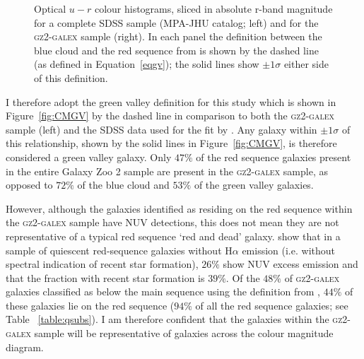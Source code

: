 \begin{figure}
\caption[Optical $u-r$ colour histograms in absolute r-band magnitude slices of the \textsc{gz2-galex} and Baldry et al. (2004) complete SDSS samples]{Optical $u-r$ colour histograms, sliced in absolute r-band magnitude for a complete SDSS sample (MPA-JHU catalog; left) and for the \textsc{gz2-galex} sample (right). In each panel the definition between the blue cloud and the red sequence from \citet{Baldry04} is shown by the dashed line (as defined in Equation~\ref{eqgv}); the solid lines show $\pm 1\sigma$ either side of this definition.}
\label{fig:cmgvsplit}
\end{figure}

I therefore adopt the \citet{Baldry04} green valley definition for this study which is shown in Figure~\ref{fig:CMGV} by the dashed line in comparison to both the \textsc{gz2-galex} sample (left) and the SDSS data used for the fit by \cite[][right]{Baldry04}. Any galaxy within $\pm 1\sigma$ of this relationship, shown by the solid lines in Figure~\ref{fig:CMGV}, is therefore considered a green valley galaxy. Only $47\%$ of the red sequence galaxies present in the entire Galaxy Zoo 2 sample are present in the \textsc{gz2-galex} sample, as opposed to $72\%$ of the blue cloud and $53\%$ of the green valley galaxies. 

However, although the galaxies identified as residing on the red sequence within the \textsc{gz2-galex} sample have NUV detections, this does not mean they are not representative of a typical red sequence `red and dead' galaxy. \cite{ko13} show that in a sample of quiescent red-sequence galaxies without $\mathrm{H}\alpha$ emission (i.e. without spectral indication of recent star formation), $26\%$ show NUV excess emission and that the fraction with recent star formation is $39\%$. Of the $48\%$ of \textsc{gz2-galex} galaxies classified as below the main sequence using the definition from \citet[][see Section~\ref{qmod}]{peng10}, $44\%$ of these galaxies lie on the red sequence ($94\%$ of all the red sequence galaxies; see Table ~\ref{table:qsubs}). I am therefore confident that the galaxies within the \textsc{gz2-galex} sample will be representative of galaxies across the colour magnitude diagram.

